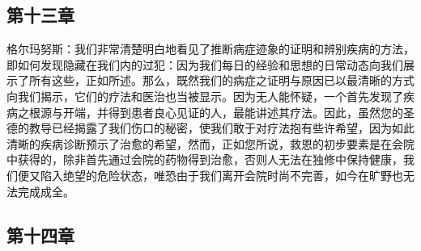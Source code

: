 
\subsection{第十三章}

\par

格尔玛努斯：我们非常清楚明白地看见了推断病症迹象的证明和辨别疾病的方法，即如何发现隐藏在我们内的过犯：因为我们每日的经验和思想的日常动态向我们展示了所有这些，正如所述。那么，既然我们的病症之证明与原因已以最清晰的方式向我们揭示，它们的疗法和医治也当被显示。因为无人能怀疑，一个首先发现了疾病之根源与开端，并得到患者良心见证的人，最能讲述其疗法。因此，虽然您的圣德的教导已经揭露了我们伤口的秘密，使我们敢于对疗法抱有些许希望，因为如此清晰的疾病诊断预示了治愈的希望，然而，正如您所说，救恩的初步要素是在会院中获得的，除非首先通过会院的药物得到治愈，否则人无法在独修中保持健康，我们便又陷入绝望的危险状态，唯恐由于我们离开会院时尚不完善，如今在旷野也无法完成成全。\par


\subsection{第十四章}

\par

